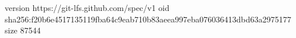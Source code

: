 version https://git-lfs.github.com/spec/v1
oid sha256:f20b6e4517135119fba64c9eab710b83aeea997eba076036413dbd63a2975177
size 87544
